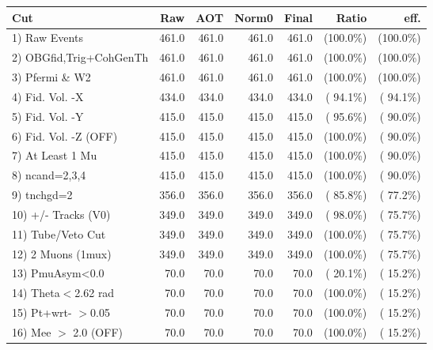 \begin{table}[h!]\centering
 \begin{tabular}{||l||r|r|r|r|r|r||}
 \hline
 \hline
 Cut & Raw & AOT & Norm0 & Final & Ratio & eff.       \\
 \hline
  1) Raw Events           &        461.0 &        461.0 &        461.0 &        461.0 & (100.0\%) & (100.0\%) \\
  2) OBGfid,Trig+CohGenTh &        461.0 &        461.0 &        461.0 &        461.0 & (100.0\%) & (100.0\%) \\
  3) Pfermi \& W2         &        461.0 &        461.0 &        461.0 &        461.0 & (100.0\%) & (100.0\%) \\
  4) Fid. Vol. -X         &        434.0 &        434.0 &        434.0 &        434.0 & ( 94.1\%) & ( 94.1\%) \\
  5) Fid. Vol. -Y         &        415.0 &        415.0 &        415.0 &        415.0 & ( 95.6\%) & ( 90.0\%) \\
  6) Fid. Vol. -Z (OFF)   &        415.0 &        415.0 &        415.0 &        415.0 & (100.0\%) & ( 90.0\%) \\
  7) At Least 1 Mu        &        415.0 &        415.0 &        415.0 &        415.0 & (100.0\%) & ( 90.0\%) \\
  8) ncand=2,3,4          &        415.0 &        415.0 &        415.0 &        415.0 & (100.0\%) & ( 90.0\%) \\
  9) tnchgd=2             &        356.0 &        356.0 &        356.0 &        356.0 & ( 85.8\%) & ( 77.2\%) \\
 10) +/- Tracks (V0)      &        349.0 &        349.0 &        349.0 &        349.0 & ( 98.0\%) & ( 75.7\%) \\
 11) Tube/Veto Cut        &        349.0 &        349.0 &        349.0 &        349.0 & (100.0\%) & ( 75.7\%) \\
 12) 2 Muons (1mux)       &        349.0 &        349.0 &        349.0 &        349.0 & (100.0\%) & ( 75.7\%) \\
 13) PmuAsym<0.0          &         70.0 &         70.0 &         70.0 &         70.0 & ( 20.1\%) & ( 15.2\%) \\
 14) Theta$<$2.62 rad     &         70.0 &         70.0 &         70.0 &         70.0 & (100.0\%) & ( 15.2\%) \\
 15) Pt+wrt- $>$0.05      &         70.0 &         70.0 &         70.0 &         70.0 & (100.0\%) & ( 15.2\%) \\
 16) Mee $>$ 2.0  (OFF)   &         70.0 &         70.0 &         70.0 &         70.0 & (100.0\%) & ( 15.2\%) \\

\end{tabular}
\end{table}
